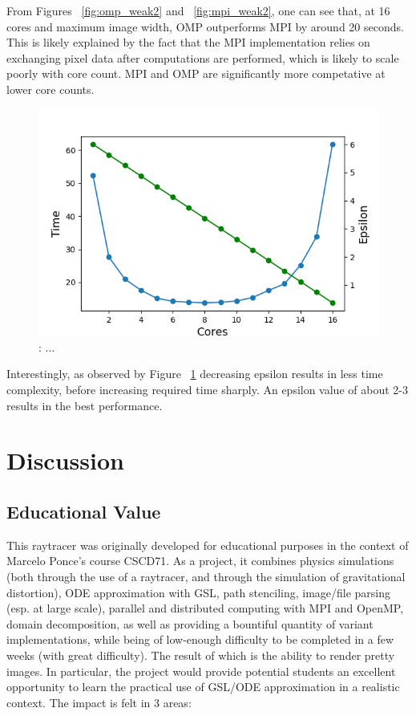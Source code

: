 From Figures ~\ref{fig:omp_weak2} and ~\ref{fig:mpi_weak2}, one can see that, at 16 cores and maximum image width, OMP outperforms MPI by around 20 seconds. This is likely explained by the fact that the MPI implementation relies on exchanging pixel data after computations are performed, which is likely to scale poorly with core count. MPI and OMP are significantly more competative at lower core counts.


\begin{figure}[h]
  \centering
  \includegraphics[width=0.55\linewidth]{figs/omp_weak.out}
	\caption{: ...}
    \label{fig:omp_weak}
\end{figure}


Interestingly, as observed by Figure ~\ref{fig:omp_weak} decreasing epsilon results in less time complexity, before increasing required time sharply. An epsilon value of about 2-3 results in the best performance.





\section{Discussion}
\label{sec:disc}

\subsection{Educational Value}


This raytracer was originally developed for educational purposes in the context of Marcelo Ponce's course CSCD71. As a project, it combines physics simulations (both through the use of a raytracer, and through the simulation of gravitational distortion), ODE approximation with GSL, path stenciling, image/file parsing (esp. at large scale), parallel and distributed computing with MPI and OpenMP, domain decomposition, as well as providing a bountiful quantity of variant implementations, while being of low-enough difficulty to be completed in a few weeks (with great difficulty). The result of which is the ability to render pretty images. In particular, the project would provide potential students an excellent opportunity to learn the practical use of GSL/ODE approximation in a realistic context. The impact is felt in 3 areas:

